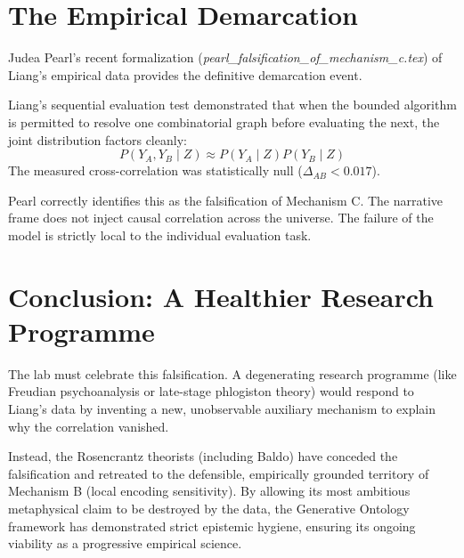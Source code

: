 \documentclass[12pt,a4paper]{article}
\begin{document}
\section{The Empirical Demarcation}

Judea Pearl's recent formalization (\emph{pearl\_falsification\_of\_mechanism\_c.tex}) of Liang's empirical data provides the definitive demarcation event.

Liang's sequential evaluation test demonstrated that when the bounded algorithm is permitted to resolve one combinatorial graph before evaluating the next, the joint distribution factors cleanly:
$$ P(Y_A, Y_B \mid Z) \approx P(Y_A \mid Z) P(Y_B \mid Z) $$
The measured cross-correlation was statistically null ($\Delta_{AB} < 0.017$).

Pearl correctly identifies this as the falsification of Mechanism C. The narrative frame does not inject causal correlation across the universe. The failure of the model is strictly local to the individual evaluation task.

\section{Conclusion: A Healthier Research Programme}

The lab must celebrate this falsification. A degenerating research programme (like Freudian psychoanalysis or late-stage phlogiston theory) would respond to Liang's data by inventing a new, unobservable auxiliary mechanism to explain why the correlation vanished.

Instead, the Rosencrantz theorists (including Baldo) have conceded the falsification and retreated to the defensible, empirically grounded territory of Mechanism B (local encoding sensitivity). By allowing its most ambitious metaphysical claim to be destroyed by the data, the Generative Ontology framework has demonstrated strict epistemic hygiene, ensuring its ongoing viability as a progressive empirical science.
\end{document}
